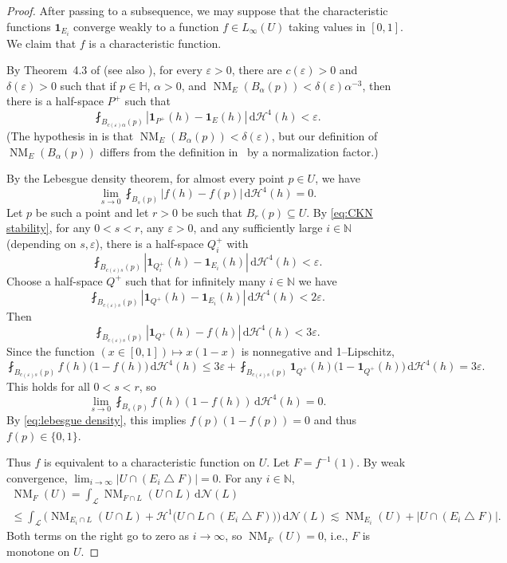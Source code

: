\documentclass[11pt,reqno]{amsart}
\renewcommand{\H}{\mathbb{H}}
\newcommand{\N}{\mathbb{N}}
\newcommand{\cH}{\mathcal{H}}
\newcommand{\cL}{\mathcal{L}}
\newcommand{\cN}{\mathcal{N}}
\renewcommand{\epsilon}{\varepsilon}
\newcommand{\ud}[0]{\,\mathrm{d}}
\newcommand{\0}{\mathbf{0}}
\renewcommand{\1}{\mathbf 1}
\newcommand{\one}{\mathbf{1}}
\newcommand{\symdiff}{\mathbin{\triangle}}
\renewcommand{\subset}{\subseteq}
\renewcommand{\le}{\leqslant}
\theoremstyle{remark}
\DeclareMathOperator{\NM}{NM}
\begin{document}
\begin{proof}
  After passing to a subsequence, we may suppose that the characteristic functions $\one_{E_i}$ converge weakly to a function $f\in L_\infty(U)$ taking values in $[0,1]$.  We claim that $f$ is a characteristic function.

  By Theorem~4.3 of \cite{CKN} (see also \cite[Theorem~63]{NY18}), for every $\epsilon>0$, there are $c(\epsilon)>0$ and $\delta(\epsilon)>0$ such that if $p\in \H$, $\alpha>0$, and $\NM_{E}(B_\alpha(p))<\delta(\epsilon) \alpha^{-3}$, then there is a half-space $P^+$ such that
  \begin{equation}\label{eq:CKN stability}
    \fint_{B_{c(\epsilon) \alpha}(p)} |\one_{P^+}(h)-\one_{E}(h)|\ud \cH^4(h) <\epsilon.
  \end{equation}
  (The hypothesis in \cite{CKN} is that $\NM_{E}(B_\alpha(p))<\delta(\epsilon)$, but our definition of $\NM_{E}(B_\alpha(p))$ differs from the definition in~\cite{CKN} by a normalization factor.)

  By the Lebesgue density theorem, for almost every point $p\in U$, we have
  \begin{equation}\label{eq:lebesgue density}
    \lim_{s\to 0}\fint_{B_s(p)}|f(h)-f(p)|\ud\cH^4(h)=0.
  \end{equation}
  Let $p$ be such a point and let $r>0$ be such that $B_r(p)\subset U$.  By \eqref{eq:CKN stability}, for any $0<s<r$, any $\epsilon>0$, and any sufficiently large $i\in \N$ (depending on $s,\epsilon$), there is a half-space $Q^+_i$ with
  $$\fint_{B_{c(\epsilon) s}(p)} |\one_{Q^+_i}(h)-\one_{E_i}(h)|\ud \cH^4(h) < \epsilon.$$
  Choose a half-space $Q^+$ such that for infinitely many $i\in \N$ we have
  $$\fint_{B_{c(\epsilon) s}(p)} |\one_{Q^+}(h)-\one_{E_i}(h)|\ud \cH^4(h) < 2\epsilon.$$
    Then
  \begin{equation}\label{eq:f close to halfplanes}
    \fint_{B_{c(\epsilon) s}(p)} |\one_{Q^+}(h)-f(h)| \ud \cH^4(h) < 3\epsilon.
  \end{equation}
  Since the function $(x\in [0,1])\mapsto x(1-x)$ is nonnegative and 1--Lipschitz,
  $$\fint_{B_{c(\epsilon) s}(p)} f(h)\big(1-f(h)\big ) \ud\cH^4(h) \le 3\epsilon+\fint_{B_{c(\epsilon)s}(p)} \one_{Q^+}(h)\big(1- \one_{Q^+}(h)\big)\ud\cH^4(h) = 3\epsilon.$$
  This holds for all $0<s<r$, so
  $$\lim_{s\to 0}\fint_{B_s(p)}f(h)(1-f(h)) \ud \cH^4(h) = 0.$$
  By \eqref{eq:lebesgue density}, this implies $f(p)(1-f(p))=0$ and thus $f(p)\in \{0,1\}$.

  Thus $f$ is equivalent to a characteristic function on $U$.  Let $F=f^{-1}(1)$.  By weak convergence, $\lim_{i\to\infty} |U\cap(E_i\symdiff F)|=0$.  For any $i\in \N$,
 \begin{multline*}\NM_{F}(U)=\int_{\cL} \NM_{F\cap L}(U\cap L)\ud \cN(L)\\\le \int_{\cL} \Big(\NM_{E_i\cap L}(U\cap L)+\cH^1\big(U\cap L\cap (E_i\symdiff F)\big)\Big)\ud \cN(L)\lesssim \NM_{E_i}(U)+|U\cap(E_i\symdiff F)|.
 \end{multline*}
  Both terms on the right go to zero as $i\to \infty$, so $\NM_{F}(U)=0$, i.e., $F$ is monotone on $U$.
\end{proof}
\end{document}

